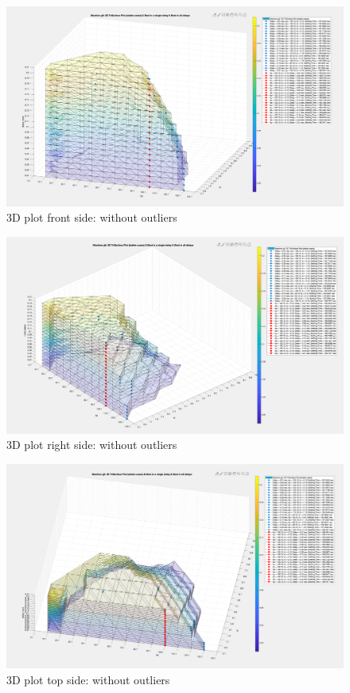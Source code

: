 \begin{figure}[htbp]
\centering
\includegraphics[width = .819\textwidth]{figure/5_4_1_without_Outlier1.png}
\caption{3D plot front side: without outliers}
\label{5_4_1_without_Outlier1}
\end{figure}

\begin{figure}[htbp]
\centering
\includegraphics[width = .819\textwidth]{figure/5_4_1_without_Outlier2.png}
\caption{3D plot right side: without outliers}
\label{5_4_1_without_Outlier2}
\end{figure}


\begin{figure}[htbp]
\centering
\includegraphics[width = .819\textwidth]{figure/5_4_1_without_Outlier3.png}
\caption{3D plot top side: without outliers}
\label{5_4_1_without_Outlier3}
\end{figure}



